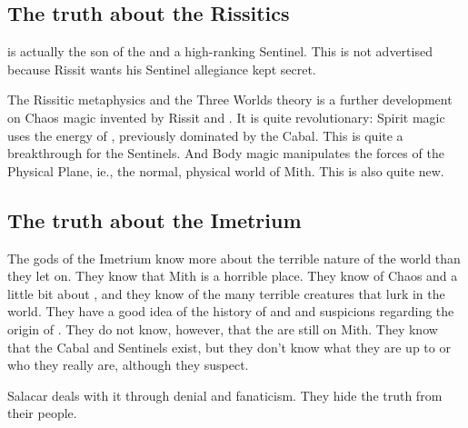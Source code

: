\subsection{The truth about the Rissitics}
\HriistN{} is actually the son of the \Dominator{} \ApepNesthra{} and a high-ranking Sentinel. This is not advertised because Rissit wants his Sentinel allegiance kept secret. 

The Rissitic metaphysics and the Three Worlds theory is a further development on Chaos magic invented by Rissit and \ApepNesthra{}. It is quite revolutionary: Spirit magic uses the energy of \Nyx{}, previously dominated by the Cabal. This is quite a breakthrough for the Sentinels. And Body magic manipulates the forces of the Physical Plane, ie., the normal, physical world of Mith. This is also quite new. 



\subsection{The truth about the Imetrium}
The gods of the Imetrium know more about the terrible nature of the world than they let on. They know that Mith is a horrible place. They know of Chaos and a little bit about \Nyx{}, and they know of the many terrible creatures that lurk in the world. They have a good idea of the history of \dragons{} and \scathae{} and suspicions regarding the origin of \humans{}. They do not know, however, that the \banes{} are still on Mith. They know that the Cabal and Sentinels exist, but they don't know what they are up to or who they really are, although they suspect. 

Salacar deals with it through denial and fanaticism. They hide the truth from their people. 


